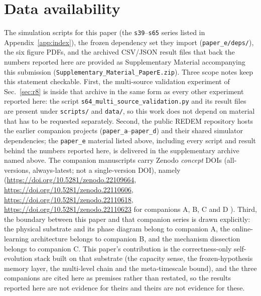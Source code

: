 \documentclass[preprint,12pt]{elsarticle}
\begin{document}
\section*{Data availability}
\begin{sloppypar}
The simulation scripts for this paper (the \texttt{s39}--\texttt{s65}
series listed in Appendix~\ref{app:index}), the frozen dependency set they
import (\texttt{paper\_e/deps/}), the six figure PDFs, and the archived
CSV/JSON result files that back the numbers reported here are provided as
Supplementary Material accompanying this submission
(\texttt{Supplementary\_Material\_PaperE.zip}). Three scope notes keep this
statement checkable. First, the multi-source validation experiment of
Sec.~\ref{sec:r8} is inside that archive in the same form as every other
experiment reported here: the script \texttt{s64\_multi\_source\_validation.py}
and its result files are present under \texttt{scripts/} and \texttt{data/}, so
this work does not depend on material that has to be requested separately.
Second, the public REDEM repository \cite{redemrepo}
hosts the earlier companion
projects (\texttt{paper\_a}--\texttt{paper\_d}) and their shared simulator
dependencies; the \texttt{paper\_e} material listed above, including every
script and result behind the numbers reported here, is delivered in the
supplementary archive named above. The companion
manuscripts carry Zenodo \emph{concept} DOIs (all-versions, always-latest;
not a single-version DOI), namely
(\url{https://doi.org/10.5281/zenodo.22109664},
\url{https://doi.org/10.5281/zenodo.22110606},
\url{https://doi.org/10.5281/zenodo.22110618},
\url{https://doi.org/10.5281/zenodo.22110623} for companions A, B, C and D
\cite{companionA,companionB,companionC,companionD}). Third, the boundary between
this paper and that companion series is drawn explicitly: the physical
substrate and its phase diagram belong to companion A, the online-learning
architecture belongs to companion B, and the mechanism dissection belongs to
companion C. This paper's contribution is the correctness-only self-evolution
stack built on that substrate (the capacity sense, the frozen-hypothesis memory
layer, the multi-level chain and the meta-timescale bound), and the three
companions are cited here as premises rather than restated, so the results
reported here are not evidence for theirs and theirs are not evidence for
these.
\end{sloppypar}
\end{document}
